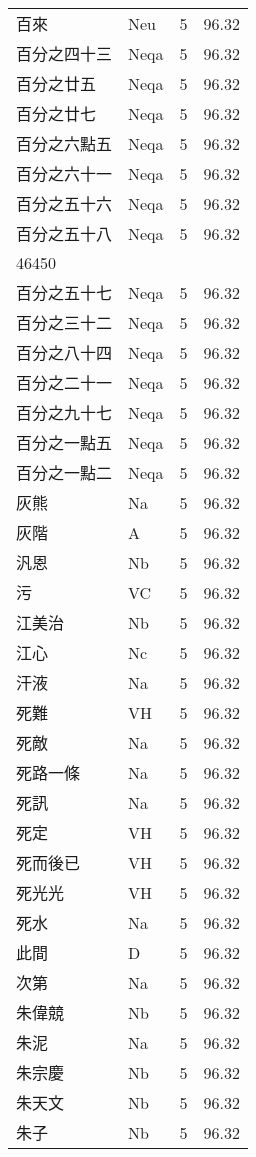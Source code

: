 \documentclass[twocolumn]{book}
\begin{document}
\begin{supertabular}{llrr}
百來 & Neu & 5 &  96.32\\
百分之四十三 & Neqa & 5 &  96.32\\
百分之廿五 & Neqa & 5 &  96.32\\
百分之廿七 & Neqa & 5 &  96.32\\
百分之六點五 & Neqa & 5 &  96.32\\
百分之六十一 & Neqa & 5 &  96.32\\
百分之五十六 & Neqa & 5 &  96.32\\
百分之五十八 & Neqa & 5 &  96.32\\
46450\\
百分之五十七 & Neqa & 5 &  96.32\\
百分之三十二 & Neqa & 5 &  96.32\\
百分之八十四 & Neqa & 5 &  96.32\\
百分之二十一 & Neqa & 5 &  96.32\\
百分之九十七 & Neqa & 5 &  96.32\\
百分之一點五 & Neqa & 5 &  96.32\\
百分之一點二 & Neqa & 5 &  96.32\\
灰熊 & Na & 5 &  96.32\\
灰階 & A & 5 &  96.32\\
汎恩 & Nb & 5 &  96.32\\
污 & VC & 5 &  96.32\\
江美治 & Nb & 5 &  96.32\\
江心 & Nc & 5 &  96.32\\
汗液 & Na & 5 &  96.32\\
死難 & VH & 5 &  96.32\\
死敵 & Na & 5 &  96.32\\
死路一條 & Na & 5 &  96.32\\
死訊 & Na & 5 &  96.32\\
死定 & VH & 5 &  96.32\\
死而後已 & VH & 5 &  96.32\\
死光光 & VH & 5 &  96.32\\
死水 & Na & 5 &  96.32\\
此間 & D & 5 &  96.32\\
次第 & Na & 5 &  96.32\\
朱偉競 & Nb & 5 &  96.32\\
朱泥 & Na & 5 &  96.32\\
朱宗慶 & Nb & 5 &  96.32\\
朱天文 & Nb & 5 &  96.32\\
朱子 & Nb & 5 &  96.32\\

\end{supertabular}
\end{document}
